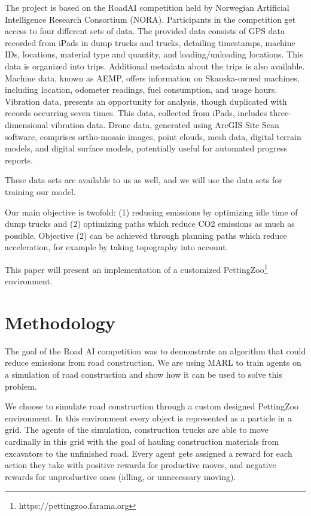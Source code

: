 \documentclass[conference]{IEEEtran}
\begin{document}
The project is based on the RoadAI competition held by Norwegian Artificial Intelligence Research
Consortium (NORA)\cite{noraRoadAIReducing}. Participants in the competition get access to four
different sets of data. The provided data consists of GPS data recorded from iPads in dump trucks and
trucks, detailing timestamps, machine IDs, locations, material type and quantity, and loading/unloading
locations. This data is organized into trips. Additional metadata about the trips is also available.
Machine data, known as AEMP, offers information on Skanska-owned machines, including location,
odometer readings, fuel consumption, and usage hours. Vibration data, presents an opportunity for analysis, though duplicated with records occurring seven times. This data, collected from
iPads, includes three-dimensional vibration data. Drone data, generated using ArcGIS Site Scan software,
comprises ortho-mosaic images, point clouds, mesh data, digital terrain models, and digital surface models,
potentially useful for automated progress reports.

These data sets are available to us as well, and we will use the data sets for training our model.

Our main objective is twofold: (1) reducing emissions by optimizing idle time of dump trucks and (2)
optimizing paths which reduce CO2 emissions as much as possible. Objective (2) can be achieved through
planning paths which reduce acceleration, for example by taking topography into account.

This paper will present an implementation of a customized PettingZoo\footnote{https://pettingzoo.farama.org}
environment.


\section{Methodology}

The goal of the Road AI competition was to demonstrate an algorithm that could reduce emissions from road construction.
We are using MARL to train agents on a simulation of road construction and show how it can be used to solve this problem.

We choose to simulate road construction through a custom designed PettingZoo environment.
In this environment every object is represented as a particle in a grid. 
The agents of the simulation, construction trucks are able to move cardinally in this grid with the goal of hauling construction materials from excavators to the unfinished road. 
Every agent gets assigned a reward for each action they take with positive rewards for productive moves, and negative rewards for unproductive ones (idling, or unnecessary moving). 
\end{document}
